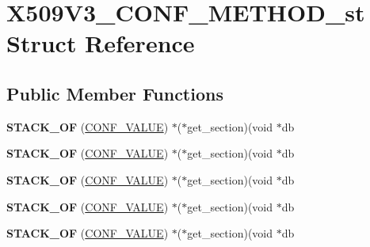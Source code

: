 \hypertarget{structX509V3__CONF__METHOD__st}{}\section{X509\+V3\+\_\+\+C\+O\+N\+F\+\_\+\+M\+E\+T\+H\+O\+D\+\_\+st Struct Reference}
\label{structX509V3__CONF__METHOD__st}
\subsection*{Public Member Functions}
\begin{DoxyCompactItemize}
\item 
\mbox{\label{structX509V3__CONF__METHOD__st_a77d6d5e2d94f1c44e4b19c3810de4f15}} 
{\bfseries S\+T\+A\+C\+K\+\_\+\+OF} (\hyperlink{structCONF__VALUE}{C\+O\+N\+F\+\_\+\+V\+A\+L\+UE}) $\ast$($\ast$get\+\_\+section)(void $\ast$db
\item 
\mbox{\label{structX509V3__CONF__METHOD__st_a77d6d5e2d94f1c44e4b19c3810de4f15}} 
{\bfseries S\+T\+A\+C\+K\+\_\+\+OF} (\hyperlink{structCONF__VALUE}{C\+O\+N\+F\+\_\+\+V\+A\+L\+UE}) $\ast$($\ast$get\+\_\+section)(void $\ast$db
\item 
\mbox{\label{structX509V3__CONF__METHOD__st_a77d6d5e2d94f1c44e4b19c3810de4f15}} 
{\bfseries S\+T\+A\+C\+K\+\_\+\+OF} (\hyperlink{structCONF__VALUE}{C\+O\+N\+F\+\_\+\+V\+A\+L\+UE}) $\ast$($\ast$get\+\_\+section)(void $\ast$db
\item 
\mbox{\label{structX509V3__CONF__METHOD__st_a77d6d5e2d94f1c44e4b19c3810de4f15}} 
{\bfseries S\+T\+A\+C\+K\+\_\+\+OF} (\hyperlink{structCONF__VALUE}{C\+O\+N\+F\+\_\+\+V\+A\+L\+UE}) $\ast$($\ast$get\+\_\+section)(void $\ast$db
\item 
\mbox{\label{structX509V3__CONF__METHOD__st_a77d6d5e2d94f1c44e4b19c3810de4f15}} 
{\bfseries S\+T\+A\+C\+K\+\_\+\+OF} (\hyperlink{structCONF__VALUE}{C\+O\+N\+F\+\_\+\+V\+A\+L\+UE}) $\ast$($\ast$get\+\_\+section)(void $\ast$db
\item 
\mbox{\label{structX509V3__CONF__METHOD__st_a77d6d5e2d94f1c44e4b19c3810de4f15}} 

\end{DoxyCompactItemize}
